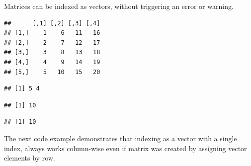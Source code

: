 \documentclass[krantz2]{krantz}\usepackage{knitr}
\begin{document}
\begin{warningbox}
Matrices can be indexed as vectors, without triggering an error or warning.

\begin{knitrout}\footnotesize
{}\color{fgcolor}\begin{kframe}
\begin{alltt}
 \hlkwb{<-} \hlstd{(}\hlopt{:}\hlstd{,}  \hlstd{=} \hlstd{)}
\end{alltt}
\begin{verbatim}
##      [,1] [,2] [,3] [,4]
## [1,]    1    6   11   16
## [2,]    2    7   12   17
## [3,]    3    8   13   18
## [4,]    4    9   14   19
## [5,]    5   10   15   20
\end{verbatim}
\begin{alltt}
\end{alltt}
\begin{verbatim}
## [1] 5 4
\end{verbatim}
\begin{alltt}
\hlstd{A[}\hlstd{]}
\end{alltt}
\begin{verbatim}
## [1] 10
\end{verbatim}
\begin{alltt}
\hlstd{A[}\hlstd{,} \hlstd{]}
\end{alltt}
\begin{verbatim}
## [1] 10
\end{verbatim}
\end{kframe}
\end{knitrout}

The next code example demonstrates that indexing as a vector with a single index, always works column-wise even if matrix  was created by assigning vector elements by row.


\end{warningbox}
\end{document}
